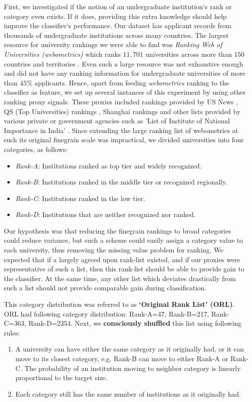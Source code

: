 \documentclass{sig-alternate-05-2015}
\begin{document}
First, we investigated if the notion of an undergraduate institution`s rank or category even exists. If it does, providing this extra knowledge should help improve the classifier`s performance. Our dataset has applicant records from thousands of undergraduate institutions across many countries. The largest resource for university rankings we were able to find was \textit{Ranking Web of Universities (webometrics)} which ranks $11,701$ universities across more than $150$ countries and territories \cite{webometrics}. Even such a large resource was not exhaustive enough and did not have any ranking information for undergraduate universities of more than $45\%$ applicants. Hence, apart from feeding \textit{webometrics} ranking to the classifier as feature, we set up several instances of this experiment by using other ranking proxy signals. These proxies included rankings provided by US News \cite{usnews}, QS (Top Universities) rankings \cite{qs}, Shanghai rankings \cite{shanghai} and other lists provided by various private or government agencies such as 'List of Institute of National Importance in India' \cite{national-importance}. Since extending the large ranking list of webometrics at such its original finegrain scale was impractical, we divided universities into four categories, as follows:
\begin{itemize}
\item \textit{Rank-A}: Institutions ranked as top tier and widely recognized.
\item \textit{Rank-B}: Institutions ranked in the middle tier or recognized regionally.
\item \textit{Rank-C}: Institutions ranked in the low tier.
\item \textit{Rank-D}: Institutions that are neither recognized nor ranked.
\end{itemize}

Our hypothesis was that  reducing the finegrain rankings to broad categories could reduce variance, but such a scheme could easily assign a category value to each university, thus removing the missing value problem for ranking. We expected that if a largely agreed upon rank-list existed, and if our proxies were representative of such a list, then this rank-list should be able to provide gain to the classifier. At the same time, any other list which deviates drastically from such a list should not provide comparable gain during classification.

This category distribution was referred to as \textbf{`Original Rank List' (ORL)}. ORL had following category distribution: Rank-A=47, Rank-B=217, Rank-C=363, Rank-D=2354. Next, we \textbf{consciously shuffled} this list using following rules:
\begin{enumerate}
\item A university can have either the same category as it originally had, or it can move to its closest category, e.g. Rank-B can move to either Rank-A or Rank-C. The probability of an institution moving to neighbor category is linearly proportional to the target size.
\item Each category still has the same number of institutions as it originally had.
\end{enumerate}
\end{document}
